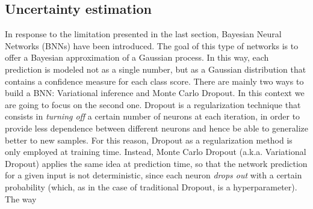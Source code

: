 \documentclass[11pt,twoside,a4paper]{article}
\begin{document}
\subsection{Uncertainty estimation}
\label{sec:uncertainty}
In response to the limitation presented in the last section, Bayesian Neural Networks (BNNs) have been introduced. The goal of this type of networks is to offer a Bayesian approximation of a Gaussian process. In this way, each prediction is modeled not as a single number, but as a Gaussian distribution that contains a confidence measure for each class score. There are mainly two ways to build a BNN: Variational inference and Monte Carlo Dropout. In this context we are going to focus on the second one.\newline
Dropout is a regularization technique that consists in \textit{turning off} a certain number of neurons at each iteration, in order to provide less dependence between different neurons and hence be able to generalize better to new samples. For this reason, Dropout as a regularization method is only employed at training time. Instead, Monte Carlo Dropout (a.k.a. Variational Dropout) applies the same idea at prediction time, so that the network prediction for a given input is not deterministic, since each neuron \textit{drops out} with a certain probability (which, as in the case of traditional Dropout, is a hyperparameter).\newline
The way 
\end{document}
